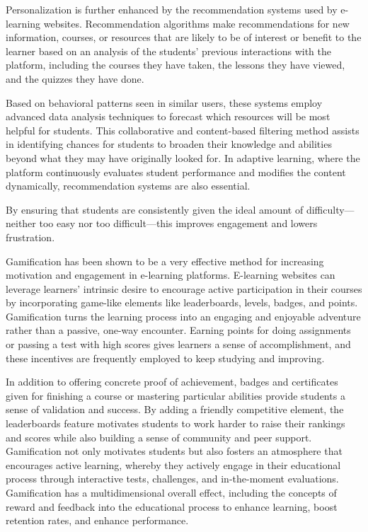 \documentclass[BTech]{audiss}
\begin{document}
Personalization is further enhanced by the recommendation systems used by e-learning websites. Recommendation algorithms make recommendations for new information, courses, or resources that are likely to be of interest or benefit to the learner based on an analysis of the students' previous interactions with the platform, including the courses they have taken, the lessons they have viewed, and the quizzes they have done.

Based on behavioral patterns seen in similar users, these systems employ advanced data analysis techniques to forecast which resources will be most helpful for students. This collaborative and content-based filtering method assists in identifying chances for students to broaden their knowledge and abilities beyond what they may have originally looked for. In adaptive learning, where the platform continuously evaluates student performance and modifies the content dynamically, recommendation systems are also essential.

By ensuring that students are consistently given the ideal amount of difficulty---neither too easy nor too difficult---this improves engagement and lowers frustration.

Gamification has been shown to be a very effective method for increasing motivation and engagement in e-learning platforms. E-learning websites can leverage learners' intrinsic desire to encourage active participation in their courses by incorporating game-like elements like leaderboards, levels, badges, and points. Gamification turns the learning process into an engaging and enjoyable adventure rather than a passive, one-way encounter. Earning points for doing assignments or passing a test with high scores gives learners a sense of accomplishment, and these incentives are frequently employed to keep studying and improving.

In addition to offering concrete proof of achievement, badges and certificates given for finishing a course or mastering particular abilities provide students a sense of validation and success. By adding a friendly competitive element, the leaderboards feature motivates students to work harder to raise their rankings and scores while also building a sense of community and peer support. Gamification not only motivates students but also fosters an atmosphere that encourages active learning, whereby they actively engage in their educational process through interactive tests, challenges, and in-the-moment evaluations. Gamification has a multidimensional overall effect, including the concepts of reward and feedback into the educational process to enhance learning, boost retention rates, and enhance performance.
\end{document}
